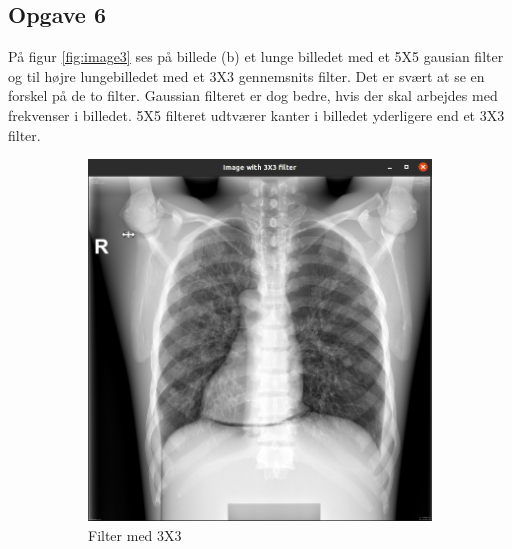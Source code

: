 \documentclass{article}
\begin{document}
\subsection{Opgave 6}
På figur \ref{fig:image3} ses på billede (b) et lunge billedet med et 5X5 gausian filter og til højre lungebilledet med et 3X3 gennemsnits filter. Det er svært at se en forskel på de to filter. Gaussian filteret er dog bedre, hvis der skal arbejdes med frekvenser i billedet. 5X5 filteret udtværer kanter i billedet yderligere end et 3X3 filter. 
\begin{figure}[H]
  \begin{subfigure}[b]{0.49\textwidth}
    \includegraphics[width=\textwidth]{Image/Image3X3.png}
    \caption{Filter med 3X3}
  \end{subfigure}
  \hfill
  \begin{subfigure}[b]{0.49\textwidth}

\end{subfigure}
\end{figure}
\end{document}
